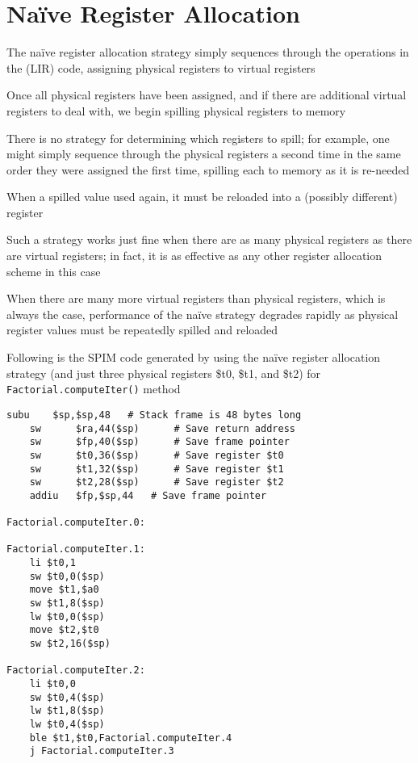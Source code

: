 \documentclass[8pt,a4paper,compress]{beamer}
\begin{document}
\section{Na\"{i}ve Register Allocation}
\begin{frame}[fragile]
\pause

The na\"{i}ve register allocation strategy simply sequences through the operations in the (LIR) code, assigning physical registers to virtual registers

\pause
\bigskip

Once all physical registers have been assigned, and if there are additional virtual registers to deal with, we begin spilling physical registers to memory

\pause
\bigskip

There is no strategy for determining which registers to spill; for example, one might simply sequence through the physical registers a second time in the same order they were assigned the first time, spilling each to memory as it is re-needed

\pause
\bigskip

When a spilled value used again, it must be reloaded into a (possibly different) register

\pause
\bigskip

Such a strategy works just fine when there are as many physical registers as there are virtual registers; in fact, it is as effective as any other register allocation scheme in this case

\pause
\bigskip

When there are many more virtual registers than physical registers, which is always the case, performance of the na\"{i}ve strategy degrades rapidly as physical register values must be repeatedly spilled and reloaded
\end{frame}

\begin{frame}[fragile]
\pause

Following is the SPIM code generated by \jmm using the na\"{i}ve register allocation strategy (and just three physical registers \$t0, \$t1, and \$t2) for \lstinline{Factorial.computeIter()} method

\begin{lstlisting}[language={}]
    subu    $sp,$sp,48 	 # Stack frame is 48 bytes long
    sw      $ra,44($sp) 	 # Save return address
    sw      $fp,40($sp) 	 # Save frame pointer
    sw      $t0,36($sp) 	 # Save register $t0
    sw      $t1,32($sp) 	 # Save register $t1
    sw      $t2,28($sp) 	 # Save register $t2
    addiu   $fp,$sp,44 	 # Save frame pointer

Factorial.computeIter.0:

Factorial.computeIter.1:
    li $t0,1
    sw $t0,0($sp)
    move $t1,$a0
    sw $t1,8($sp)
    lw $t0,0($sp)
    move $t2,$t0
    sw $t2,16($sp)

Factorial.computeIter.2:
    li $t0,0
    sw $t0,4($sp)
    lw $t1,8($sp)
    lw $t0,4($sp)
    ble $t1,$t0,Factorial.computeIter.4
    j Factorial.computeIter.3

\end{lstlisting}
\end{frame}
\end{document}
